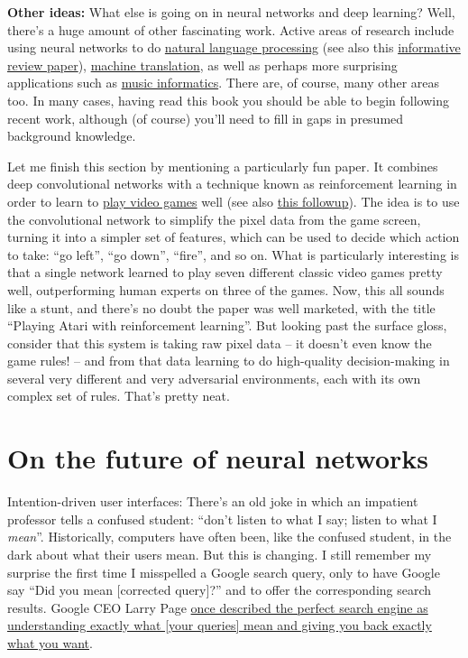 \documentclass[a4paper,twoside,10pt]{book}
\begin{document}
\textbf{Other ideas:} What else is going on in neural networks and deep learning? Well, there's a huge amount of other fascinating work. Active areas of research include using neural networks to do \href{http://machinelearning.org/archive/icml2008/papers/391.pdf}{natural language processing} (see also this \href{http://arxiv.org/abs/1103.0398}{informative review paper}), \href{http://neuralnetworksanddeeplearning.com/assets/MachineTranslation.pdf}{machine translation}, as well as perhaps more surprising applications such as \href{http://yann.lecun.com/exdb/publis/pdf/humphrey-jiis-13.pdf}{music informatics}. There are, of course, many other areas too. In many cases, having read this book you should be able to begin following recent work, although (of course) you'll need to fill in gaps in presumed background knowledge.

Let me finish this section by mentioning a particularly fun paper. It combines deep convolutional networks with a technique known as reinforcement learning in order to learn to \href{http://www.cs.toronto.edu/~vmnih/docs/dqn.pdf}{play video games} well (see also \href{http://www.nature.com/nature/journal/v518/n7540/abs/nature14236.html}{this followup}). The idea is to use the convolutional network to simplify the pixel data from the game screen, turning it into a simpler set of features, which can be used to decide which action to take: ``go left'', ``go down'', ``fire'', and so on. What is particularly interesting is that a single network learned to play seven different classic video games pretty well, outperforming human experts on three of the games. Now, this all sounds like a stunt, and there's no doubt the paper was well marketed, with the title ``Playing Atari with reinforcement learning''. But looking past the surface gloss, consider that this system is taking raw pixel data -- it doesn't even know the game rules! -- and from that data learning to do high-quality decision-making in several very different and very adversarial environments, each with its own complex set of rules. That's pretty neat.

\section{On the future of neural networks}
Intention-driven user interfaces: There's an old joke in which an impatient professor tells a confused student: ``don't listen to what I say; listen to what I \textit{mean}''. Historically, computers have often been, like the confused student, in the dark about what their users mean. But this is changing. I still remember my surprise the first time I misspelled a Google search query, only to have Google say ``Did you mean [corrected query]?'' and to offer the corresponding search results. Google CEO Larry Page \href{http://googleblog.blogspot.ca/2012/08/building-search-engine-of-future-one.html}{once described the perfect search engine as understanding exactly what [your queries] mean and giving you back exactly what you want}.
\end{document}
